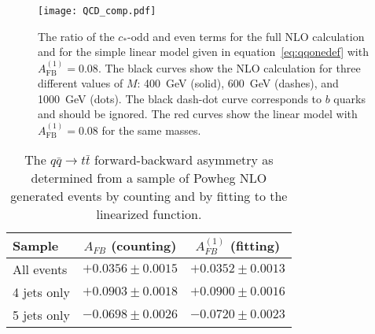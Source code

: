 \documentclass{cmspaperpdf}
\begin{document}
\begin{figure}[hbt]
  \begin{center}
    \texttt{[image: QCD\_comp.pdf]}
  \caption{\small The ratio of the $c_*$-odd and even terms for the full NLO calculation and for the simple linear model given in equation~\ref{eq:qqonedef} with $A_\mathrm{FB}^{(1)} = 0.08$.  The black curves show the NLO calculation for three different values of $M$: 400~GeV (solid), 600~GeV (dashes), and 1000~GeV (dots).  The black dash-dot curve corresponds to $b$ quarks and should be ignored.  The red curves show the linear model with $A_\mathrm{FB}^{(1)} = 0.08$ for the same masses.}
    \label{fig:qcd_comp}
  \end{center}
\end{figure}

\begin{table}[hbt]
\begin{center}
\caption{\small \label{tab:afb_counting_fitting} The $q\bar q\to t\bar t$ forward-backward asymmetry as determined from a sample of Powheg NLO generated events by counting and by fitting to the linearized function.}
\vspace{3pt}
\begin{tabular}{|l|cc|}\hline
 Sample      & $A_{FB}$ (counting) & $A_{FB}^{(1)}$ (fitting) \\ \hline
All events   & $+0.0356\pm0.0015$  & $+0.0352\pm0.0013$       \\ 
4 jets only  & $+0.0903\pm0.0018$  & $+0.0900\pm0.0016$       \\ 
5 jets only  & $-0.0698\pm0.0026$  & $-0.0720\pm0.0023$       \\ 
\hline
\end{tabular}
\end{center}
\end{table}
\end{document}
